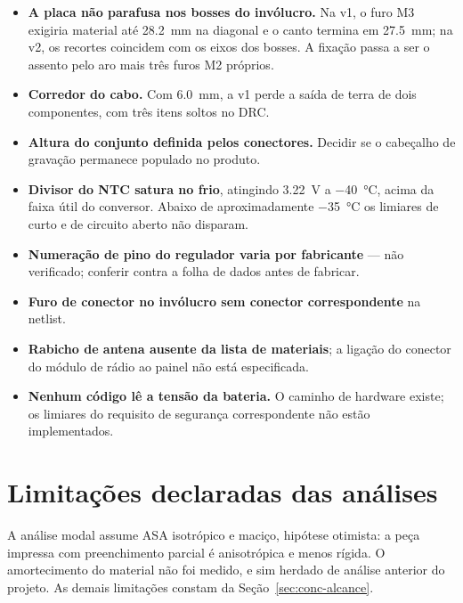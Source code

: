 \begin{itemize}
  \item \textbf{A placa não parafusa nos bosses do invólucro.} Na v1, o furo M3 exigiria
        material até \SI{28,2}{\milli\meter} na diagonal e o canto termina em
        \SI{27,5}{\milli\meter}; na v2, os recortes coincidem com os eixos dos bosses. A
        fixação passa a ser o assento pelo aro mais três furos M2 próprios.
  \item \textbf{Corredor do cabo.} Com \SI{6,0}{\milli\meter}, a v1 perde a saída de terra
        de dois componentes, com três itens soltos no DRC.
  \item \textbf{Altura do conjunto definida pelos conectores.} Decidir se o cabeçalho de
        gravação permanece populado no produto.
  \item \textbf{Divisor do NTC satura no frio}, atingindo \SI{3,22}{\volt} a
        \SI{-40}{\celsius}, acima da faixa útil do conversor. Abaixo de aproximadamente
        \SI{-35}{\celsius} os limiares de curto e de circuito aberto não disparam.
  \item \textbf{Numeração de pino do regulador varia por fabricante} ---
        \textsf{não verificado}; conferir contra a folha de dados antes de fabricar.
  \item \textbf{Furo de conector no invólucro sem conector correspondente} na netlist.
  \item \textbf{Rabicho de antena ausente da lista de materiais}; a ligação do conector
        do módulo de rádio ao painel não está especificada.
  \item \textbf{Nenhum código lê a tensão da bateria.} O caminho de hardware existe; os
        limiares do requisito de segurança correspondente não estão implementados.
\end{itemize}

\section{Limitações declaradas das análises}
\label{sec:ape-limitacoes}

A análise modal assume ASA isotrópico e maciço, hipótese otimista: a peça impressa com
preenchimento parcial é anisotrópica e menos rígida. O amortecimento do material não foi
medido, e sim herdado de análise anterior do projeto. As demais limitações constam da
Seção~\ref{sec:conc-alcance}.
